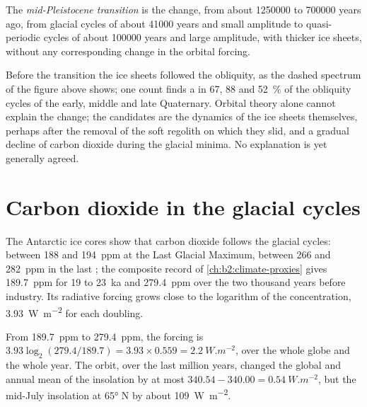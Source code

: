 \begin{definition}\label{def:b2:orbital-forcing:mpt}
The \emph{mid-Pleistocene transition} is the change, from about
\num{1250000} to \num{700000} years ago, from glacial cycles of about \num{41000} years and small
amplitude to quasi-periodic cycles of about \num{100000} years and large amplitude, with thicker
ice sheets, without any corresponding change in the orbital forcing.
\end{definition}

Before the transition the ice sheets followed the obliquity, as the dashed spectrum of the figure
above shows; one count finds a  in 67, 88 and \qty{52}{\percent} of the
obliquity cycles of the early, middle and late Quaternary. Orbital theory alone cannot explain the change; the candidates are the dynamics
of the ice sheets themselves, perhaps after the removal of the soft regolith on which they slid,
and a gradual decline of carbon dioxide during the glacial minima. No explanation is yet
generally agreed.

\section{Carbon dioxide in the glacial cycles}\label{sec:b2:orbital-forcing:co2}

The Antarctic ice cores show that carbon dioxide follows the glacial cycles: between 188 and
\qty{194}{ppm} at the Last Glacial Maximum, between 266 and \qty{282}{ppm} in the last ;
the composite record of \cref{ch:b2:climate-proxies} gives \qty{189.7}{ppm} for 19 to
\qty{23}{ka} and \qty{279.4}{ppm} over the two thousand years before industry. Its radiative forcing
grows close to the logarithm of the concentration, \qty{3.93}{W.m^{-2}} for each doubling.

\begin{example}\label{ex:b2:orbital-forcing:co2}
From \qty{189.7}{ppm} to \qty{279.4}{ppm}, the forcing is $3.93\log_2(279.4/189.7) = 3.93 \times
0.559 = \qty{2.2}{W.m^{-2}}$, over the whole globe and the whole year. The orbit, over the last
million years, changed the global and annual mean of the insolation by at most $340.54 - 340.00 =
\qty{0.54}{W.m^{-2}}$, but the mid-July insolation at \ang{65} N by about \qty{109}{W.m^{-2}}.
\end{example}

